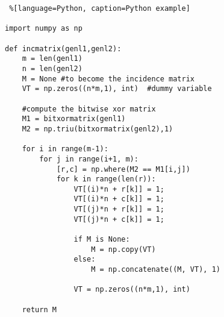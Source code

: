 \begin{lstlisting} %[language=Python, caption=Python example]

import numpy as np
    
def incmatrix(genl1,genl2):
    m = len(genl1)
    n = len(genl2)
    M = None #to become the incidence matrix
    VT = np.zeros((n*m,1), int)  #dummy variable
    
    #compute the bitwise xor matrix
    M1 = bitxormatrix(genl1)
    M2 = np.triu(bitxormatrix(genl2),1) 

    for i in range(m-1):
        for j in range(i+1, m):
            [r,c] = np.where(M2 == M1[i,j])
            for k in range(len(r)):
                VT[(i)*n + r[k]] = 1;
                VT[(i)*n + c[k]] = 1;
                VT[(j)*n + r[k]] = 1;
                VT[(j)*n + c[k]] = 1;
                
                if M is None:
                    M = np.copy(VT)
                else:
                    M = np.concatenate((M, VT), 1)
                
                VT = np.zeros((n*m,1), int)
    
    return M
\end{lstlisting}

\usepackage{listings}
\usepackage{xcolor}



\lstset{style=mystyle}